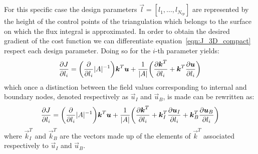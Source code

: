 \smallskip
For this specific case the design parameters $\vec{l} = [l_1, \dots, l_{N_{cp}}]$ are represented by the height of the control points of the triangulation which belongs to the surface on which the flux integral is approximated. In order to obtain the desired gradient of the cost function we can differentiate equation~\eqref{eqn:J_3D_compact} respect each design parameter. Doing so for the $i$-th parameter yields:
\begin{equation}
	\label{eqn:diff_J_3D_single_param_mid_step}
	\frac{\partial J}{\partial l_i} = \biggl( \frac{\partial}{\partial l_i} \lvert A\rvert^{-1} \biggr) \boldsymbol{k}^T \boldsymbol{u} + \frac{1}{\lvert A\rvert} \biggl( \frac{\partial \boldsymbol{k}^T}{\partial l_i} + \boldsymbol{k}^T \frac{\partial \boldsymbol{u}}{\partial l_i} \biggr)
\end{equation}
which once a distinction between the field values corresponding to internal and boundary nodes, denoted respectively as $\vec{u}_I$ and $\vec{u}_B$, is made can be rewritten as:
\begin{equation}
	\frac{\partial J}{\partial l_i} = \biggl( \frac{\partial}{\partial l_i} \lvert A\rvert^{-1} \biggr) \boldsymbol{k}^T \boldsymbol{u} + \frac{1}{\lvert A\rvert} \biggl( \frac{\partial \boldsymbol{k}^T}{\partial l_i} + \boldsymbol{k}_I^T \frac{\partial \boldsymbol{u}_I}{\partial l_i} + \boldsymbol{k}_B^T \frac{\partial \boldsymbol{u}_B}{\partial l_i}\biggr)
\end{equation}
where $\vec{k}_I^T$ and $\vec{k}_B^T$ are the vectors made up of the elements of $\vec{k}^T$ associated respectively to $\vec{u}_I$ and $\vec{u}_B$.

